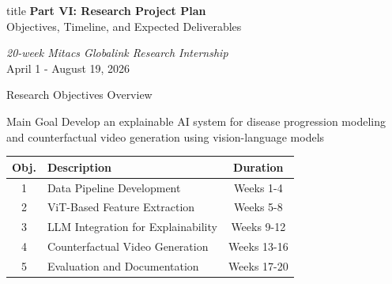 \documentclass[aspectratio=169]{beamer}
\begin{document}
\begin{frame}[plain]
    \centering
    \vfill
    \begin{beamercolorbox}[center,shadow=true,rounded=true]{title}
        \textbf{Part VI: Research Project Plan}\\
        \vspace{0.5em}
        \large Objectives, Timeline, and Expected Deliverables
    \end{beamercolorbox}
    \vfill
    
    \vspace{1em}
    \normalsize
    \textit{20-week Mitacs Globalink Research Internship}\\
    April 1 - August 19, 2026
\end{frame}

\begin{frame}{Research Objectives Overview}
    \begin{block}{Main Goal}
        Develop an explainable AI system for disease progression modeling and counterfactual video generation using vision-language models
    \end{block}
    
    \begin{center}
        \begin{tabular}{@{}clc@{}}
            \toprule
            \textbf{Obj.} & \textbf{Description} & \textbf{Duration} \\
            \midrule
            1 & Data Pipeline Development & Weeks 1-4 \\
            2 & ViT-Based Feature Extraction & Weeks 5-8 \\
            3 & LLM Integration for Explainability & Weeks 9-12 \\
            4 & Counterfactual Video Generation & Weeks 13-16 \\
            5 & Evaluation and Documentation & Weeks 17-20 \\
            \bottomrule
        \end{tabular}
    \end{center}
\end{frame}
\end{document}
